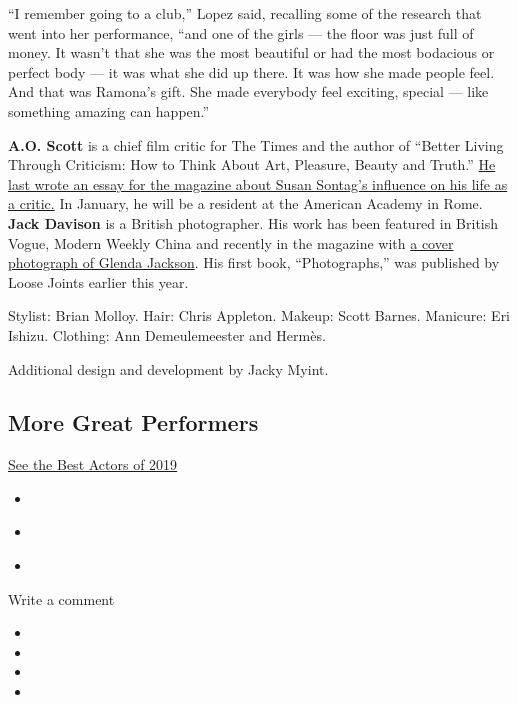 ``I remember going to a club,'' Lopez said, recalling some of the
research that went into her performance, ``and one of the girls --- the
floor was just full of money. It wasn't that she was the most beautiful
or had the most bodacious or perfect body --- it was what she did up
there. It was how she made people feel. And that was Ramona's gift. She
made everybody feel exciting, special --- like something amazing can
happen.''

\textbf{A.O. Scott} is a chief film critic for The Times and the author
of ``Better Living Through Criticism: How to Think About Art, Pleasure,
Beauty and Truth.''
\href{https://www.nytimes3xbfgragh.onion/interactive/2019/10/08/magazine/susan-sontag.html}{He
last wrote an essay for the magazine about Susan Sontag's influence on
his life as a critic.} In January, he will be a resident at the American
Academy in Rome. \textbf{Jack Davison} is a British photographer. His
work has been featured in British Vogue, Modern Weekly China and
recently in the magazine with
\href{https://www.nytimes3xbfgragh.onion/2019/03/27/magazine/glenda-jackson-king-lear.html}{a
cover photograph of Glenda Jackson}. His first book, ``Photographs,''
was published by Loose Joints earlier this year.

Stylist: Brian Molloy. Hair: Chris Appleton. Makeup: Scott Barnes.
Manicure: Eri Ishizu. Clothing: Ann Demeulemeester and Hermès.

Additional design and development by Jacky Myint.

\hypertarget{more-great-performers}{%
\subsection{More Great Performers}\label{more-great-performers}}

\href{https://www.nytimes3xbfgragh.onion/interactive/2019/12/09/magazine/best-actors.html}{See
the Best Actors of 2019}

\begin{itemize}
\tightlist
\item
  \href{/interactive/2019/12/09/magazine/brad-pitt-interview.html}{}
\item
  \href{/interactive/2019/12/09/magazine/robert-deniro-interview.html}{}
\item
  \href{/interactive/2019/12/09/magazine/lupita-nyongo-us.html}{}
\end{itemize}

Write a comment

\begin{itemize}
\item
\item
\item
\item
\end{itemize}

